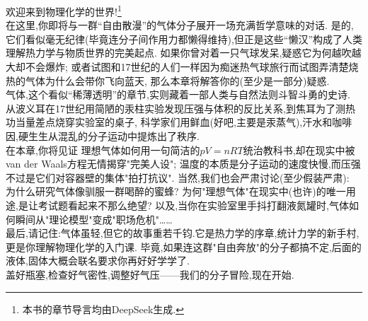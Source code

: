 \documentclass{ctexart}
\begin{document}
\pagestyle{plain}
%
\begin{center}
\end{center}\vspace{15pt}

\indent 欢迎来到物理化学的世界!\footnote{本书的章节导言均由DeepSeek生成.}\\
\indent 在这里,你即将与一群“自由散漫”的气体分子展开一场充满哲学意味的对话.%
是的,它们看似毫无纪律(毕竟连分子间作用力都懒得维持),但正是这些“懒汉”构成了人类理解热力学与物质世界的完美起点.%
如果你曾对着一只气球发呆,疑惑它为何越吹越大却不会爆炸;%
或者试图和17世纪的人们一样因为痴迷热气球旅行而试图弄清楚烧热的气体为什么会带你飞向蓝天,%
那么本章将解答你的(至少是一部分)疑惑.\\
\indent 气体,这个看似“稀薄透明”的章节,实则藏着一部人类与自然法则斗智斗勇的史诗.%
从波义耳在17世纪用简陋的汞柱实验发现压强与体积的反比关系,到焦耳为了测热功当量差点烧穿实验室的桌子,%
科学家们用鲜血(好吧,主要是汞蒸气),汗水和咖啡因,硬生生从混乱的分子运动中提炼出了秩序.\\
\indent 在本章,你将见证%
理想气体如何用一句简洁的$pV=nRT$统治教科书,却在现实中被van der Waals方程无情揭穿"完美人设";%
温度的本质是分子运动的速度快慢,而压强不过是它们对容器壁的集体"拍打抗议".%
当然,我们也会严肃讨论(至少假装严肃):%
为什么研究气体像驯服一群喝醉的蜜蜂?%
为何"理想气体"在现实中(也许)的唯一用途,是让考试题看起来不那么绝望?%
以及,当你在实验室里手抖打翻液氮罐时,气体如何瞬间从"理论模型"变成"职场危机"……\\
\indent 最后,请记住:气体虽轻,但它的故事重若千钧.它是热力学的序章,统计力学的新手村,更是你理解物理化学的入门课.%
毕竟,如果连这群"自由奔放"的分子都搞不定,后面的液体,固体大概会联名要求你再好好学学了.\\
\indent 盖好瓶塞,检查好气密性,调整好气压——我们的分子冒险,现在开始.
\newpage

\newpage

\newpage

\end{document}
